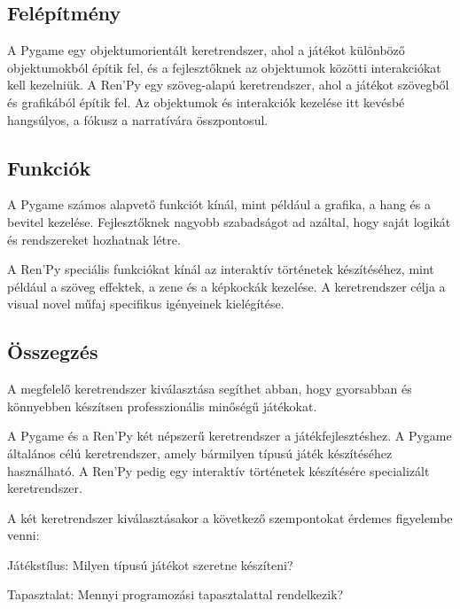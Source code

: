 \subsection{Felépítmény}

\indent \indent A Pygame egy objektumorientált keretrendszer, ahol a játékot különböző objektumokból építik fel, és a fejlesztőknek az objektumok közötti interakciókat kell kezelniük.
A Ren'Py egy szöveg-alapú keretrendszer, ahol a játékot szövegből és grafikából építik fel. Az objektumok és interakciók kezelése itt kevésbé hangsúlyos, a fókusz a narratívára összpontosul.

\subsection{Funkciók}

\indent \indent A Pygame számos alapvető funkciót kínál, mint például a grafika, a hang és a bevitel kezelése. Fejlesztőknek nagyobb szabadságot ad azáltal, hogy saját logikát és rendszereket hozhatnak létre.

A Ren'Py speciális funkciókat kínál az interaktív történetek készítéséhez, mint például a szöveg effektek, a zene és a képkockák kezelése. A keretrendszer célja a visual novel műfaj specifikus igényeinek kielégítése.

\subsection{Összegzés}
\indent \indent A megfelelő keretrendszer kiválasztása segíthet abban, hogy gyorsabban és könnyebben készítsen professzionális minőségű játékokat.

A Pygame és a Ren'Py két népszerű keretrendszer a játékfejlesztéshez. A Pygame általános célú keretrendszer, amely bármilyen típusú játék készítéséhez használható. A Ren'Py pedig egy interaktív történetek készítésére specializált keretrendszer.

A két keretrendszer kiválasztásakor a következő szempontokat érdemes figyelembe venni:

Játékstílus: Milyen típusú játékot szeretne készíteni?

Tapasztalat: Mennyi programozási tapasztalattal rendelkezik?


